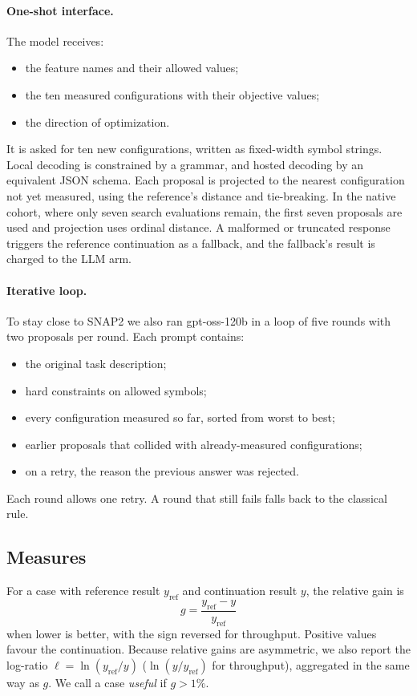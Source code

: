 \paragraph{One-shot interface.} The model receives:
\begin{itemize}
  \item the feature names and their allowed values;
  \item the ten measured configurations with their objective values;
  \item the direction of optimization.
\end{itemize}
It is asked for ten new configurations, written as fixed-width symbol strings. Local decoding is constrained by a grammar, and hosted decoding by an equivalent JSON schema. Each proposal is projected to the nearest configuration not yet measured, using the reference's distance and tie-breaking. In the native cohort, where only seven search evaluations remain, the first seven proposals are used and projection uses ordinal distance. A malformed or truncated response triggers the reference continuation as a fallback, and the fallback's result is charged to the LLM arm.

\paragraph{Iterative loop.} To stay close to SNAP2 we also ran gpt-oss-120b in a loop of five rounds with two proposals per round. Each prompt contains:
\begin{itemize}
  \item the original task description;
  \item hard constraints on allowed symbols;
  \item every configuration measured so far, sorted from worst to best;
  \item earlier proposals that collided with already-measured configurations;
  \item on a retry, the reason the previous answer was rejected.
\end{itemize}
Each round allows one retry. A round that still fails falls back to the classical rule.

\subsection{Measures}

For a case with reference result $y_{\mathrm{ref}}$ and continuation result $y$, the relative gain is
\[
g = \frac{y_{\mathrm{ref}} - y}{y_{\mathrm{ref}}}
\]
when lower is better, with the sign reversed for throughput. Positive values favour the continuation. Because relative gains are asymmetric, we also report the log-ratio $\ell = \ln(y_{\mathrm{ref}}/y)$ ($\ln(y/y_{\mathrm{ref}})$ for throughput), aggregated in the same way as $g$. We call a case \emph{useful} if $g > 1\%$.

